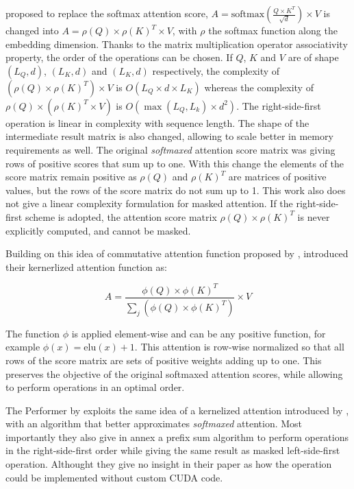 \citet{shen2020efficient} proposed to
 replace the softmax attention score,
 $A = \mathrm{softmax}\left(\frac{Q \times K^T}{\sqrt{d}}\right) \times V$ is
changed into $A = \rho(Q) \times \rho(K)^T \times V$, with $\rho$
the softmax function along the embedding dimension. Thanks to the matrix
multiplication operator associativity property, the order of the operations can be chosen.
If $Q$, $K$ and $V$ are of shape $(L_Q, d)$, $(L_K, d)$ and
$(L_K, d)$ respectively, the complexity of
$(\rho(Q) \times \rho(K)^T) \times V$ is $O(L_Q \times d \times L_K)$ whereas the complexity of
$\rho(Q) \times (\rho(K)^T \times V)$ is
$O\left(\max(L_Q, L_k) \times d^2 \right)$. The right-side-first
operation is linear in complexity with sequence length. The shape of the
intermediate result matrix is also changed, allowing to scale better
in memory requirements as well. The original \emph{softmaxed} attention score
matrix was giving rows of positive scores that sum up to one. With this
change the elements of the score matrix remain positive as $\rho(Q)$
and $\rho(K)^T$ are matrices of positive values, but the rows of the score matrix do not sum up to 1. This work also does not give a linear complexity formulation for masked attention. If the right-side-first
scheme is adopted, the attention score matrix
$\rho(Q) \times \rho(K)^T$ is never explicitly computed, and cannot be
masked.

Building on this idea of commutative attention function proposed by
\citet{shen2020efficient}, \citet{katharopoulos2020transformers} introduced their kernerlized attention function as:

\begin{equation}
A = \frac{\phi(Q) \times \phi(K)^T}{\sum_j \left( \phi(Q) \times \phi(K)^T \right)} \times V
\end{equation}

The function $\phi$ is applied element-wise and can be any positive
function, for example $\phi(x) = \mathrm{elu}(x) + 1$. This attention is
row-wise normalized so that all rows of the score matrix are sets of
positive weights adding up to one. This preserves the objective of the
original softmaxed attention scores, while allowing to perform
operations in an optimal order.

The Performer by \citet{choromanski2021rethinking} exploits the same idea of a kernelized attention introduced
by \citet{katharopoulos2020transformers}, with an algorithm that better approximates \emph{softmaxed} attention. Most
importantly they also give in annex a prefix sum algorithm to perform operations in the right-side-first order while giving the same result as masked left-side-first operation. Althought they give no insight in their paper as how the operation could be implemented without custom CUDA code.

